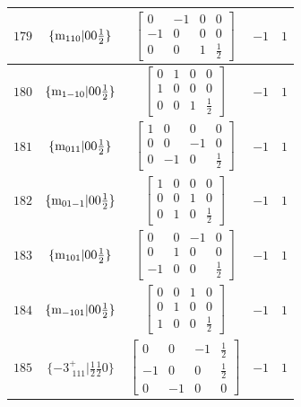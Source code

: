 \documentclass[fleqn,8pt]{jsarticle}
\begin{document}
\begin{longtable}{ccccc}
$ 179 $ & $ \{{\rm m}_{110}|0 0 \frac{1}{2}\} $ & $ \begin{bmatrix} 0 & -1 & 0 & 0 \\ -1 & 0 & 0 & 0 \\ 0 & 0 & 1 & \frac{1}{2} \end{bmatrix} $ & $ -1 $ & $ 1 $ \\ \hline
$ 180 $ & $ \{{\rm m}_{1-10}|0 0 \frac{1}{2}\} $ & $ \begin{bmatrix} 0 & 1 & 0 & 0 \\ 1 & 0 & 0 & 0 \\ 0 & 0 & 1 & \frac{1}{2} \end{bmatrix} $ & $ -1 $ & $ 1 $ \\ \hline
$ 181 $ & $ \{{\rm m}_{011}|0 0 \frac{1}{2}\} $ & $ \begin{bmatrix} 1 & 0 & 0 & 0 \\ 0 & 0 & -1 & 0 \\ 0 & -1 & 0 & \frac{1}{2} \end{bmatrix} $ & $ -1 $ & $ 1 $ \\ \hline
$ 182 $ & $ \{{\rm m}_{01-1}|0 0 \frac{1}{2}\} $ & $ \begin{bmatrix} 1 & 0 & 0 & 0 \\ 0 & 0 & 1 & 0 \\ 0 & 1 & 0 & \frac{1}{2} \end{bmatrix} $ & $ -1 $ & $ 1 $ \\ \hline
$ 183 $ & $ \{{\rm m}_{101}|0 0 \frac{1}{2}\} $ & $ \begin{bmatrix} 0 & 0 & -1 & 0 \\ 0 & 1 & 0 & 0 \\ -1 & 0 & 0 & \frac{1}{2} \end{bmatrix} $ & $ -1 $ & $ 1 $ \\ \hline
$ 184 $ & $ \{{\rm m}_{-101}|0 0 \frac{1}{2}\} $ & $ \begin{bmatrix} 0 & 0 & 1 & 0 \\ 0 & 1 & 0 & 0 \\ 1 & 0 & 0 & \frac{1}{2} \end{bmatrix} $ & $ -1 $ & $ 1 $ \\ \hline
$ 185 $ & $ \{-3^{+}_{\,\,111}|\frac{1}{2} \frac{1}{2} 0\} $ & $ \begin{bmatrix} 0 & 0 & -1 & \frac{1}{2} \\ -1 & 0 & 0 & \frac{1}{2} \\ 0 & -1 & 0 & 0 \end{bmatrix} $ & $ -1 $ & $ 1 $ \\ \hline

\end{longtable}
\end{document}
